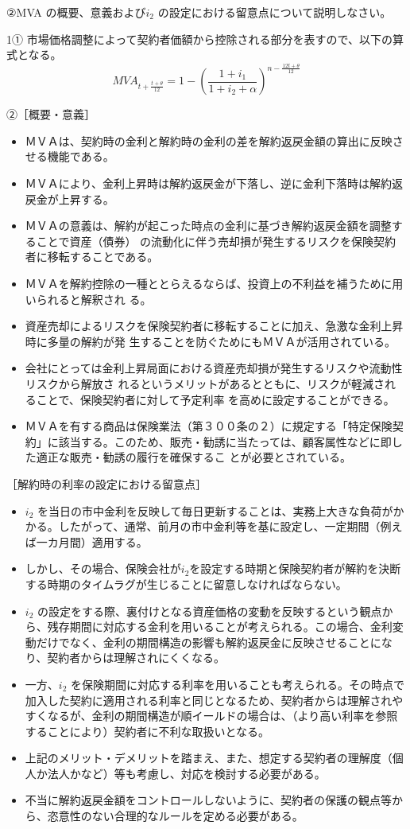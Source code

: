 \documentclass[report,gutter=10mm,fore-edge=10mm,uplatex,dvipdfmx]{jlreq}
\begin{document}
②MVA の概要、意義および$i_2$ の設定における留意点について説明しなさい。


1① 市場価格調整によって契約者価額から控除される部分を表すので、以下の算式となる。
$$
MVA_{t+\frac{t+\theta}{12}} = 1-\left(\frac{1+i_1}{1+i_2+\alpha}\right)^{n-\frac{12t+\theta}{12}}
$$

②［概要・意義］
\begin{itemize}
 \item ＭＶＡは、契約時の金利と解約時の金利の差を解約返戻金額の算出に反映させる機能である。
 \item ＭＶＡにより、金利上昇時は解約返戻金が下落し、逆に金利下落時は解約返戻金が上昇する。
 \item ＭＶＡの意義は、解約が起こった時点の金利に基づき解約返戻金額を調整することで資産（債券） の流動化に伴う売却損が発生するリスクを保険契約者に移転することである。
 \item ＭＶＡを解約控除の一種ととらえるならば、投資上の不利益を補うために用いられると解釈され る。
 \item 資産売却によるリスクを保険契約者に移転することに加え、急激な金利上昇時に多量の解約が発 生することを防ぐためにもＭＶＡが活用されている。
 \item 会社にとっては金利上昇局面における資産売却損が発生するリスクや流動性リスクから解放さ れるというメリットがあるとともに、リスクが軽減されることで、保険契約者に対して予定利率 を高めに設定することができる。
 \item ＭＶＡを有する商品は保険業法（第３００条の２）に規定する「特定保険契約」に該当する。このため、販売・勧誘に当たっては、顧客属性などに即した適正な販売・勧誘の履行を確保するこ とが必要とされている。
\end{itemize}

［解約時の利率の設定における留意点］
\begin{itemize}
 \item $i_2$ を当日の市中金利を反映して毎日更新することは、実務上大きな負荷がかかる。したがって、通常、前月の市中金利等を基に設定し、一定期間（例えば一カ月間）適用する。
 \item しかし、その場合、保険会社が$i_2$を設定する時期と保険契約者が解約を決断する時期のタイムラグが生じることに留意しなければならない。
 \item $i_2$ の設定をする際、裏付けとなる資産価格の変動を反映するという観点から、残存期間に対応する金利を用いることが考えられる。この場合、金利変動だけでなく、金利の期間構造の影響も解約返戻金に反映させることになり、契約者からは理解されにくくなる。
 \item 一方、$i_2$ を保険期間に対応する利率を用いることも考えられる。その時点で加入した契約に適用される利率と同じとなるため、契約者からは理解されやすくなるが、金利の期間構造が順イールドの場合は、（より高い利率を参照することにより）契約者に不利な取扱いとなる。
 \item 上記のメリット・デメリットを踏まえ、また、想定する契約者の理解度（個人か法人かなど）等も考慮し、対応を検討する必要がある。
 \item 不当に解約返戻金額をコントロールしないように、契約者の保護の観点等から、恣意性のない合理的なルールを定める必要がある。
\end{itemize}
\end{document}
